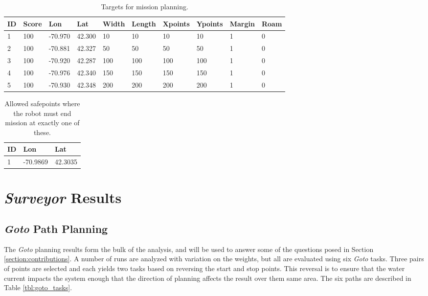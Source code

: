 \documentclass{tamuccthesis}
\begin{document}
\begin{table}[H]\small
    \begin{tabular}{|l|l|l|l|l|l|l|l|l|l|}
\hline
ID & Score & Lon & Lat & Width & Length & Xpoints & Ypoints & Margin & Roam \\
\hline
1 & 100 & -70.970 & 42.300 & 10 & 10 & 10 & 10 & 1 & 0 \\
\hline
2 & 100 & -70.881 & 42.327 & 50 & 50 & 50 & 50 & 1 & 0 \\
\hline
3 & 100 & -70.920 & 42.287 & 100 & 100 & 100 & 100 & 1 & 0 \\
\hline
4 & 100 & -70.976 & 42.340 & 150 & 150 & 150 & 150 & 1 & 0 \\
\hline
5 & 100 & -70.930 & 42.348 & 200 & 200 & 200 & 200 & 1 & 0 \\
\hline  
        
    \end{tabular}
    \caption[Targets for mission planning.]{Targets for mission planning.}
    \label{tbl:targets}
\end{table}

\begin{table}[H]\small
    \begin{tabular}{|l|l|l|}
\hline
ID & Lon & Lat\\
\hline
1 & -70.9869 & 42.3035 \\
\hline  
    \end{tabular}
    \caption[Robot safepoints.]{Allowed safepoints where the robot must end mission at exactly one of these.}
    \label{tbl:safepoints}
\end{table}

\section{\textit{Surveyor} Results}

\subsection{\textit{Goto} Path Planning}

The \textit{Goto} planning results form the bulk of the analysis, and will be used to answer some of the questions posed in Section \ref{section:contributions}. A number of runs are analyzed with variation on the weights, but all are evaluated using six \textit{Goto} tasks. Three pairs of points are selected and each yields two tasks based on reversing the start and stop points. This reversal is to ensure that the water current impacts the system enough that the direction of planning affects the result over them same area. The six paths are described in Table \ref{tbl:goto_tasks}.
\end{document}
